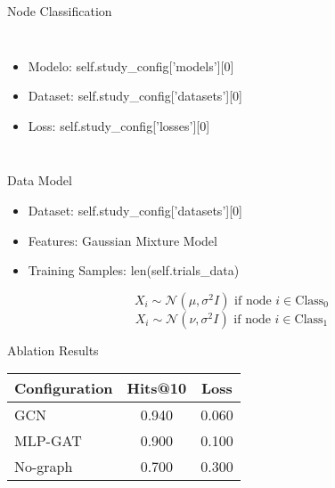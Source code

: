\documentclass{beamer}
\begin{document}
\begin{frame}
\titlepage
\end{frame}
\begin{frame}{Node Classification}
\begin{columns}
    \begin{itemize}
        \item Modelo: {self.study_config['models'][0]}
        \item Dataset: {self.study_config['datasets'][0]}
        \item Loss: {self.study_config['losses'][0]}
    \end{itemize}
\end{columns}
\end{frame}
\begin{frame}{Data Model}
\begin{itemize}
\item Dataset: {self.study_config['datasets'][0]}
\item Features: Gaussian Mixture Model
\item Training Samples: {len(self.trials_data)}
\end{itemize}

\[ X_i \sim \mathcal{N}(\mu, \sigma^2I) \text{ if node } i \in \text{Class}_0 \]
\[ X_i \sim \mathcal{N}(\nu, \sigma^2I) \text{ if node } i \in \text{Class}_1 \]
\end{frame}
\begin{frame}{Ablation Results}
\begin{table}
\centering
\begin{tabular}{lcc}
\toprule
Configuration & Hits@10 & Loss \\
\midrule
GCN & 0.940 & 0.060 \\
MLP-GAT & 0.900 & 0.100 \\
No-graph & 0.700 & 0.300 \\
\bottomrule
\end{tabular}
\end{table}
\end{frame}
\end{document}
